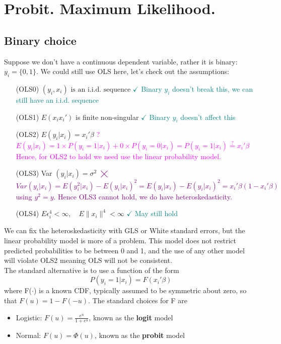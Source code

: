 \documentclass[DIV=14,titlepage=false]{scrreprt}
\begin{document}
\vspace{-10pt}
\setcounter{chapter}{9}

\chapter{Probit. Maximum Likelihood.}
\vspace{-10pt}
\section{Binary choice}
Suppose we don't have a continuous dependent variable, rather it is binary: $y_i = \{0,1\}$. We could still use OLS here, let's check out the assumptions:
\begin{itemize}
    \item [(OLS0)]  $(y_i, x_i)\text{ is an i.i.d. sequence}$
    \subitem \textcolor{teal}{$\checkmark$ Binary $y_i$ doesn't break this, we can still have an i.i.d. sequence}
    \item [(OLS1)] $ E(x_i x_i')$  is finite non-singular
    \subitem \textcolor{teal}{$\checkmark$ Binary $y_i$ doesn't affect this}
    \item [(OLS2)] $E(y_i|x_i) = x_i'\beta$
    \subitem \textcolor{magenta}{? $E(y_i|x_i)=1\times P(y_i=1|x_i)+0\times P(y_i=0|x_i)=P(y_i=1|x_i) \overset{?}{=}x_i'\beta$ 
    \subitem Hence, for OLS2 to hold we need use the linear probability model.}
    \item [(OLS3)] Var $(y_i|x_i)= \sigma^2$
    \subitem \textcolor{purple}{$\bigtimes$ $Var(y_i|x_i) = E(y_i^2|x_i)-E(y_i|x_i)^2=E(y_i|x_i)-E(y_i|x_i)^2=x_i'\beta(1-x_i'\beta)$
    \subitem using $y^2=y$. Hence OLS3 cannot hold, we do have heteroskedasticity.}
    \item [(OLS4)] $E\epsilon_i^4 < \infty, \quad E\|x_i\|^4 < \infty$
    \subitem \textcolor{teal}{$\checkmark$ May still hold}
\end{itemize}
We can fix the heteroskedasticity with GLS or White standard errors, but the linear probability model is more of a problem. This model does not restrict predicted probabilities to be between 0 and 1, and the use of any other model will violate OLS2 meaning OLS will not be consistent.\\
The standard alternative is to use a function of the form \[ P(y_i=1|x_i)=F(x_i'\beta)\] where F($\cdot$) is a known CDF, typically assumed to be symmetric about zero, so that $F(u)=1-F(-u)$. The standard choices for F are
\begin{itemize}
    \item Logistic: $F(u) = \frac{e^u}{1+e^u}$, known as the \textbf{logit} model
    \item Normal: $F(u) = \Phi(u)$, known as the \textbf{probit} model
\end{itemize}
\end{document}
